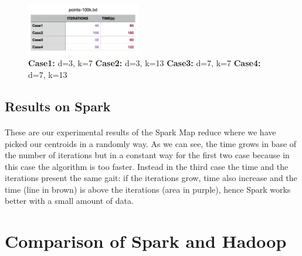 \documentclass{book}
\begin{document}
    \begin{figure}[H]
        \hfill
        \hfill
        \hfill
        \includegraphics[width=5cm]{spark/tabella_point100k}
        \centering
        \caption{\footnotesize{\textbf{Case1:} d=3, k=7 \textbf{Case2:} d=3, k=13 \textbf{Case3:} d=7, k=7 \textbf{Case4:} d=7, k=13}}
    \end{figure}

    \subsection{Results on Spark}
    \paragraph{}
    These are our experimental results of the Spark Map reduce where we have picked our centroids in a randomly way. As we can see, the time grows in base of the number of iterations but in a constant way for the first two case because in this case the algorithm is too faster. Instead in the third case the time and the iterations present the same gait: if the iterations grow, time also increase and the time (line in brown) is above the iterations (area in purple), hence Spark works better with a small amount of data. 

    \section{Comparison of Spark and Hadoop}
\end{document}
